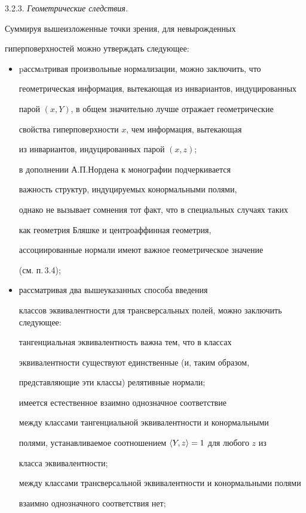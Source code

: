 3.2.3. {\it Геометрические следствия.}


Суммируя вышеизложенные точки зрения, для невырожденных


гиперповерхностей можно утверждать следующее:


\begin{itemize}


\item[(i)] pассмaтривая произвольные нормализации, можно заключить, что


геометрическая информация, вытекающая из инвариантов, индуцированных


парой $(x,Y)$, в общем значительно лучше отражает геометрические


свойства гиперповерхности $x$, чем информация, вытекающая


из инвариантов, индуцированных парой $(x,z)$;


в дополнении А.П.Нордена к монографии \cite{SCHI} подчеркивается


важность структур, индуцируемых конормальными полями,


однако не вызывает сомнения тот факт, что в специальных случаях таких


как геометрия Бляшке и центроаффинная геометрия,


ассоциированные нормали имеют важное геометрическое значение


(см. п.\,3.4);


\item[(ii)] рассматривая два вышеуказанных способа введения


классов эквивалентности для трансверсальных полей, можно заключить следующее:


тангенциальная эквивалентность важна тем, что в классах


эквивалентности существуют единственные (и, таким образом,


представляющие эти классы) релятивные нормали;


имеется естественное взаимно однозначное соответствие


между классами тангенциальной эквивалентности и конормальными


полями, устанавливаемое соотношением $\langle Y,z\rangle =1$ для любого $z$ из


класса эквивалентности;


между классами трансверсальной эквивалентности и конормальными полями


взаимно однозначного соответствия нет;



\end{itemize}
